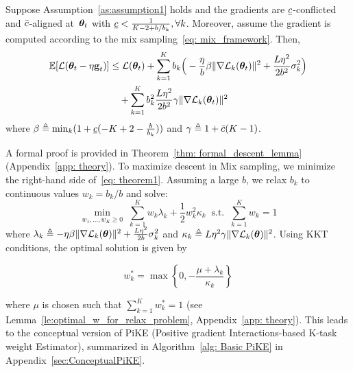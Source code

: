 \begin{theorem}
%
\label{thm:DescentMainBody}
Suppose Assumption~\ref{as:assumption1} holds and   the gradients are $\underline{c}$-conflicted and $\bar{c}$-aligned at~$\bm{\theta}_t$ with
$\underline{c} <\frac{1}{K -2 + b/b_k}, \forall k$. Moreover, assume the gradient is computed according to the mix sampling~\eqref{eq: mix_framework}. Then, 
    \begin{align} \label{eq: theorem1}
        \mathbb{E}[\mathcal{L}(\bm{\theta}_t - \eta \boldsymbol{\mathrm{g}}_t)] &\leq \mathcal{L}(\bm{\theta}_t) + \sum^K_{k=1} b_k\Big(-\frac{\eta}{b}\beta\|\nabla\mathcal{L}_k(\bm{\theta}_t)\|^2 + \frac{L\eta^2}{2b^2}\sigma_k^2\Big) \nonumber\\
        &\quad   + \sum^K_{k=1} b_k^2 \frac{L\eta^2}{2b^2}\gamma \|\nabla \mathcal{L}_k(\bm{\theta}_t)\|^2 
    \end{align}
    where $\beta \triangleq \min_{k} (1+\underline{c}(-K+2-\frac{b}{b_k}))$ and $\gamma \triangleq 1 + \bar{c} (K-1)$.
\end{theorem}
A formal proof is provided in Theorem~\ref{thm: formal_descent_lemma} (Appendix~\ref{app: theory}). To maximize descent in Mix sampling, we minimize the right-hand side of~\eqref{eq: theorem1}. Assuming a large \( b \), we relax \( b_k \) to continuous values \( w_k = b_k / b \) and solve:  
\begin{equation} \label{eq:relax_problem}
%
    \min_{w_1,\ldots,w_K\geq0} \; \sum^K_{k=1}  w_k \lambda_k + \frac{1}{2} w_k^2\kappa_k 
    \;\; \textrm{s.t.} \;\; 
    \sum_{k=1}^Kw_k = 1
%
\end{equation}
where $\lambda_k\triangleq -\eta\beta\|\nabla\mathcal{L}_k(\bm{\theta})\|^2 + \frac{L\eta^2}{2b} \sigma_k^2$ and $\kappa_k\triangleq L\eta^2\gamma\|\nabla\mathcal{L}_k(\bm{\theta})\|^2$. Using KKT conditions, the optimal solution is given by 

\vspace{-0.3cm}

\begin{equation}\label{eq:OptimalWeight}
w_k^* = \max\left\{0, -\frac{\mu + \lambda_k}{\kappa_k}\right\} 
\end{equation}


\noindent where $\mu$ is chosen such that $\sum_{k=1}^K w_k^* = 1$ (see Lemma~\ref{le:optimal_w_for_relax_problem},  Appendix~\ref{app: theory}). 
This   leads to the conceptual version of PiKE (Positive gradient Interactions-based K-task weight Estimator),  summarized in Algorithm~\ref{alg: Basic PiKE} in Appendix~\ref{sec:ConceptualPiKE}.



